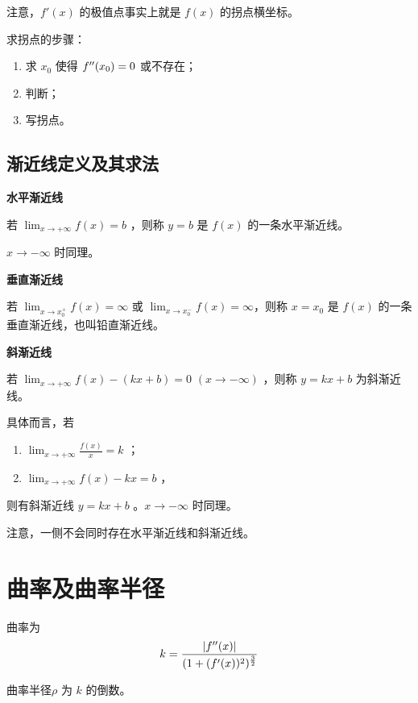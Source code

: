 注意，$ f'(x) $ 的极值点事实上就是 $ f(x) $ 的拐点横坐标。

求拐点的步骤：\begin{enumerate}
    \item 求 $ x_0 $ 使得 $ f^{\prime\prime}(x_0)=0 $ 或不存在；
    \item 判断；
    \item 写拐点。
\end{enumerate}

\subsection{渐近线定义及其求法}

\textbf{水平渐近线}

若 $ {\displaystyle\lim_{x\rightarrow +\infty}}f(x)=b $ ，则称 $ y=b $ 是 $ f(x) $ 的一条水平渐近线。

$ x\rightarrow-\infty $ 时同理。


\textbf{垂直渐近线}

若 $ {\displaystyle\lim_{x\rightarrow x_0^+}}f(x)=\infty $ 
或 $ {\displaystyle\lim_{x\rightarrow x_0^-}}f(x)=\infty $，则称 $ x=x_0 $ 是 $ f(x) $ 的一条垂直渐近线，也叫铅直渐近线。

\textbf{斜渐近线} 

若 $ {\displaystyle\lim_{x\rightarrow +\infty}}f(x)-(kx+b)=0 $ $ (x\rightarrow-\infty) $ ，则称
$ y=kx+b $ 为斜渐近线。

具体而言，若\begin{enumerate}
    \item $ {\displaystyle\lim_{x\rightarrow +\infty}}\frac{f(x)}{x}=k $ ；
    \item $ {\displaystyle\lim_{x\rightarrow +\infty}}f(x)-kx = b $ ，
\end{enumerate}
则有斜渐近线 $ y=kx+b $ 。$ x\rightarrow-\infty $ 时同理。

注意，一侧不会同时存在水平渐近线和斜渐近线。

\section{曲率及曲率半径}

曲率为$$
   k=\frac{|f^{\prime\prime}(x)|}{(1+(f'(x))^2)^{\frac{3}{2}}}
$$ 

曲率半径$ \rho $ 为 $ k $ 的倒数。